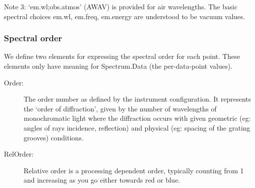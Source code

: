 \documentclass[11pt]{article}
\begin{document}
Note 3: `em.wl;obs.atmos' (AWAV) is provided for air wavelengths. The basic spectral
choices em.wl, em.freq, em.energy are understood to be vacuum values.

\subsubsection{Spectral order}

We define two elements for expressing the spectral order for each point.
These elements only have meaning for Spectrum.Data (the per-data-point values).

\begin{description}
\item[Order:]  The order number as defined by the instrument configuration.
  It represents the ‘order of diffraction’, given by the number of wavelengths
  of monochromatic light where the diffraction occurs with given geometric
  (eg: angles of rays incidence, reflection) and physical (eg: spacing of
  the grating grooves) conditions.

\item[RelOrder:] Relative order is a processing dependent order, typically
  counting from 1 and increasing as you go either towards red or blue.

\end{description}
\end{document}
